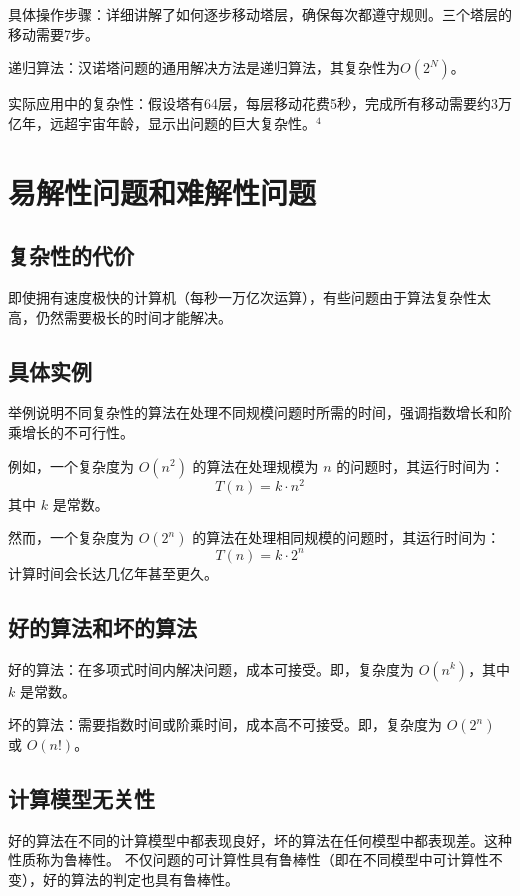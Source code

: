 \documentclass[UTF-8,a4paper,9pt]{article}
\begin{document}
具体操作步骤：详细讲解了如何逐步移动塔层，确保每次都遵守规则。三个塔层的移动需要7步。

递归算法：汉诺塔问题的通用解决方法是递归算法，其复杂性为$O(2^N)$。

实际应用中的复杂性：假设塔有64层，每层移动花费5秒，完成所有移动需要约3万亿年，远超宇宙年龄，显示出问题的巨大复杂性。$^4$

\section{易解性问题和难解性问题}

\subsection{复杂性的代价}

即使拥有速度极快的计算机（每秒一万亿次运算），有些问题由于算法复杂性太高，仍然需要极长的时间才能解决。

\subsection{具体实例}

举例说明不同复杂性的算法在处理不同规模问题时所需的时间，强调指数增长和阶乘增长的不可行性。

例如，一个复杂度为 $O(n^2)$ 的算法在处理规模为 $n$ 的问题时，其运行时间为：
\[
  T(n) = k \cdot n^2
\]
其中 $k$ 是常数。

然而，一个复杂度为 $O(2^n)$ 的算法在处理相同规模的问题时，其运行时间为：
\[
  T(n) = k \cdot 2^n
\]
计算时间会长达几亿年甚至更久。

\subsection{好的算法和坏的算法}

好的算法：在多项式时间内解决问题，成本可接受。即，复杂度为 $O(n^k)$，其中 $k$ 是常数。

坏的算法：需要指数时间或阶乘时间，成本高不可接受。即，复杂度为 $O(2^n)$ 或 $O(n!)$。

\subsection{计算模型无关性}

好的算法在不同的计算模型中都表现良好，坏的算法在任何模型中都表现差。这种性质称为鲁棒性。
不仅问题的可计算性具有鲁棒性（即在不同模型中可计算性不变），好的算法的判定也具有鲁棒性。
\end{document}
